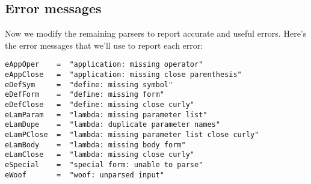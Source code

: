\documentclass{tmr}
\begin{document}
\subsection{Error messages}
Now we modify the remaining parsers to report accurate and useful errors.
Here's the error messages that we'll use to report each error:
\begin{verbatim}
eAppOper    =  "application: missing operator"
eAppClose   =  "application: missing close parenthesis"
eDefSym     =  "define: missing symbol"
eDefForm    =  "define: missing form"
eDefClose   =  "define: missing close curly"
eLamParam   =  "lambda: missing parameter list"
eLamDupe    =  "lambda: duplicate parameter names"
eLamPClose  =  "lambda: missing parameter list close curly"
eLamBody    =  "lambda: missing body form"
eLamClose   =  "lambda: missing close curly"
eSpecial    =  "special form: unable to parse"
eWoof       =  "woof: unparsed input"
\end{verbatim}
\end{document}
